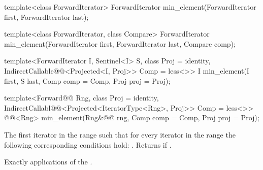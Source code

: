 %
\begin{removedblock}
\begin{itemdecl}
template<class ForwardIterator>
  ForwardIterator min_element(ForwardIterator first, ForwardIterator last);

template<class ForwardIterator, class Compare>
  ForwardIterator min_element(ForwardIterator first, ForwardIterator last,
                            Compare comp);
\end{itemdecl}
\end{removedblock}
\begin{addedblock}
\begin{itemdecl}
template<ForwardIterator I, Sentinel<I> S, class Proj = identity,
    IndirectCallable@@<Projected<I, Proj>> Comp = less<>>
  I min_element(I first, S last, Comp comp = Comp{}, Proj proj = Proj{});

template<Forward@@ Rng, class Proj = identity,
    IndirectCallabl@@<Projected<IteratorType<Rng>, Proj>> Comp = less<>>
  @@<Rng>
    min_element(Rng&@\newtxt{\&}@ rng, Comp comp = Comp{}, Proj proj = Proj{});
\end{itemdecl}
\end{addedblock}

\begin{itemdescr}
\pnum
\returns
The first iterator
in the range
such that for every iterator
in the range
the following corresponding conditions hold:
.
Returns
if
.

\pnum
\complexity
Exactly
applications of the .
\end{itemdescr}

